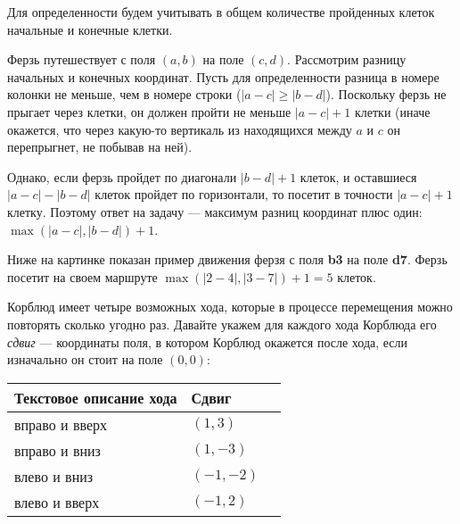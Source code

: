 ﻿
\begin{itemize}
\itA Для определенности будем учитывать в общем количестве пройденных клеток начальные и конечные клетки.

Ферзь путешествует с поля $(a,b)$ на поле $(c,d)$. Рассмотрим разницу начальных и конечных координат. 
Пусть для определенности разница в номере колонки не меньше, чем в номере строки ($|a-c| \ge |b-d|$).
Поскольку ферзь не прыгает через клетки, он должен пройти не меньше $|a-c|+1$ клетки (иначе окажется,
что через какую-то вертикаль из находящихся между $a$ и $c$ он перепрыгнет, не побывав на ней).

Однако, если ферзь пройдет по диагонали $|b-d|+1$ клеток, и оставшиеся $|a-c|-|b-d|$ клеток пройдет
по горизонтали, то посетит в точности $|a-c|+1$ клетку. 
Поэтому ответ на задачу --- максимум разниц координат плюс один: $\max(|a-c|,|b-d|)+1$.

Ниже на картинке показан пример движения ферзя с поля {\bfseries b3} на поле {\bfseries d7}. 
Ферзь посетит на своем маршруте $\max(|2-4|,|3-7|)+1 = 5$ клеток.

\begin{center}\end{center}

\itB Корблюд имеет четыре возможных хода, которые в процессе перемещения можно повторять сколько угодно
раз. Давайте укажем для каждого хода Корблюда его \emph{сдвиг} --- координаты поля, в котором 
Корблюд окажется после хода, если изначально он стоит на поле $(0,0)$:

\begin{center}\begin{tabular}{lll}
Текстовое описание хода & Сдвиг\\
\hline                       
вправо и вверх & $(1,3)$  \\
вправо и вниз & $(1,-3)$  \\
влево и вниз & $(-1,-2)$  \\
влево и вверх & $(-1,2)$  \\
\end{tabular}\end{center}


\end{itemize}
